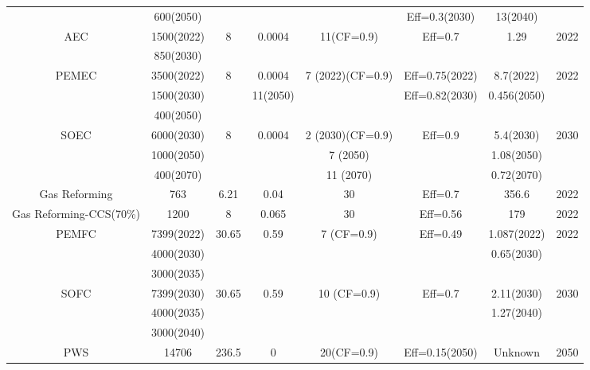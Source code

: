\begin{landscape}
\begin{longtable}{ |*{8}{c|} }
  & 600(2050) &  &  &  &Eff=0.3(2030)  & 13(2040) &  \\
\gls{AEC} & 1500(2022) & 8 & 0.0004 & 11(CF=0.9) & Eff=0.7 & 1.29 & 2022\\
 & 850(2030) &  &  &  &  & &  \\
\gls{PEMEC} & 3500(2022) & 8 & 0.0004 & 7 (2022)(CF=0.9) & Eff=0.75(2022) & 8.7(2022) & 2022\\
 & 1500(2030) &  & 11(2050)  &  & Eff=0.82(2030) & 0.456(2050)  &  \\
 & 400(2050) &  &  &  & &  &  \\
\gls{SOEC} & 6000(2030) & 8 & 0.0004 & 2 (2030)(CF=0.9) & Eff=0.9 & 5.4(2030) & 2030\\
 & 1000(2050) &  &  & 7 (2050) &  & 1.08(2050) & \\
 & 400(2070) &  &  & 11 (2070) &  & 0.72(2070) & \\
Gas Reforming & 763 & 6.21 & 0.04 & 30  & Eff=0.7 & 356.6 & 2022\\
Gas Reforming-CCS(70\%) & 1200 & 8 & 0.065 & 30 & Eff=0.56 & 179 & 2022\\
\gls{PEMFC} & 7399(2022) & 30.65 & 0.59 & 7 (CF=0.9) & Eff=0.49 & 1.087(2022) & 2022\\
 & 4000(2030) &  &  &  &  & 0.65(2030) &  \\
 & 3000(2035) &  &  &  &  &  &  \\
\gls{SOFC} & 7399(2030) & 30.65 & 0.59 & 10 (CF=0.9) & Eff=0.7 & 2.11(2030) & 2030\\
 & 4000(2035) &  &  &  &  & 1.27(2040) &  \\
 & 3000(2040) &  &  &  &  & &  \\
\gls{PWS} & 14706  & 236.5 & 0 & 20(CF=0.9) & Eff=0.15(2050) & Unknown & 2050
\label{eco}
\end{longtable}
\end{landscape}


